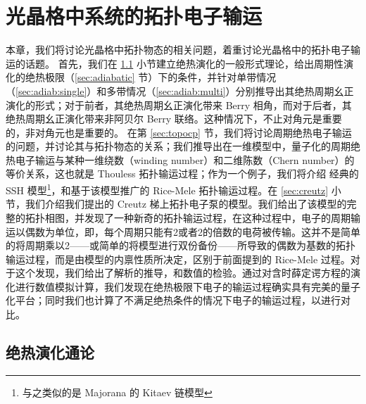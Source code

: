 \chapter{光晶格中系统的拓扑电子输运} \label{chap:chargepump}

本章，我们将讨论光晶格中拓扑物态的相关问题，着重讨论光晶格中的拓扑电子输运的话题。
首先，我们在 \ref{sec:adiabevolgeneral} 小节建立绝热演化的一般形式理论，给出周期性演化的绝热极限（\ref{sec:adiabatic} 节）下的条件，并针对单带情况（\ref{sec:adiab:single}）和多带情况（\ref{sec:adiab:multi}）分别推导出其绝热周期幺正演化的形式；对于前者，其绝热周期幺正演化带来 Berry 相角，而对于后者，其绝热周期幺正演化带来非阿贝尔 Berry 联络。这种情况下，不止对角元是重要的，非对角元也是重要的。
在第 \ref{sec:topocp} 节，我们将讨论周期绝热电子输运的问题，并讨论其与拓扑物态的关系；我们推导出在一维模型中，量子化的周期绝热电子输运与某种一维绕数（winding number）和二维陈数（Chern number）的等价关系，这也就是 Thouless 拓扑输运过程\cite{thouless1983}；作为一个例子，我们将介绍 经典的 SSH 模型\cite{ssh1979}\footnote{与之类似的是 Majorana 的 Kitaev 链模型\cite{kitaev2001}}，和基于该模型推广的 Rice-Mele 拓扑输运过程\cite{ricemele1982}。在 \ref{sec:creutz} 小节，我们介绍我们提出的 Creutz 梯\cite{creutz1999}上拓扑电子泵的模型\cite{creutz}。我们给出了该模型的完整的拓扑相图，并发现了一种新奇的拓扑输运过程，在这种过程中，电子的周期输运以偶数为单位，即，每个周期只能有2或者2的倍数的电荷被传输。这并不是简单的将周期乘以2——或简单的将模型进行双份备份——所导致的偶数为基数的拓扑输运过程，而是由模型的内禀性质所决定，区别于前面提到的 Rice-Mele 过程。对于这个发现，我们给出了解析的推导，和数值的检验。通过对含时薛定谔方程的演化进行数值模拟计算，我们发现在绝热极限下电子的输运过程确实具有完美的量子化平台；同时我们也计算了不满足绝热条件的情况下电子的输运过程，以进行对比。





\section{绝热演化通论}\label{sec:adiabevolgeneral}

